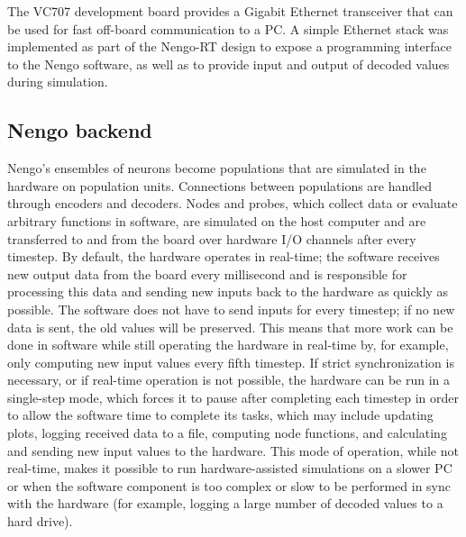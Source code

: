 \documentclass[english]{article}
\begin{document}
The VC707 development board provides a Gigabit Ethernet transceiver that can be used for fast off-board communication to a PC.
A simple Ethernet stack was implemented as part of the Nengo-RT design to expose a programming interface to the Nengo software,
as well as to provide input and output of decoded values during simulation.


\subsection{Nengo backend}

Nengo's ensembles of neurons become populations that are simulated in the hardware on population units.
Connections between populations are handled through encoders and decoders.
Nodes and probes, which collect data or evaluate arbitrary functions in software, are
simulated on the host computer and are transferred to and from the board over hardware 
I/O channels after every timestep. 
By default, the hardware operates in real-time; the software receives new output data from the board
every millisecond and is responsible for processing this data and sending new inputs back to the hardware as quickly as possible.
The software does not have to send inputs for every timestep; if no new data is sent, the old values will be preserved.
This means that more work can be done in software while still operating the hardware in real-time by, for example,
only computing new input values every fifth timestep.
If strict synchronization is necessary, or if real-time operation is not possible,
the hardware can be run in a single-step mode, which forces it to pause after completing each timestep in order
to allow the software time to complete its tasks, which may include updating plots, logging received data to a file,
computing node functions, and calculating and sending new input values to the hardware.
This mode of operation, while not real-time, makes it possible to run hardware-assisted simulations
on a slower PC or when the software component is too complex or slow to be performed in sync with the hardware
(for example, logging a large number of decoded values to a hard drive).
\end{document}
